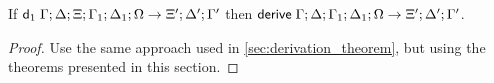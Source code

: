 \begin{theorem}
   If $\mathsf{d}_1 \; \Gamma; \Delta; \Xi; \Gamma_1; \Delta_1; \Omega \rightarrow \Xi'; \Delta'; \Gamma'$ then $\mathsf{derive} \; \Gamma; \Delta; \Gamma_1; \Delta_1; \Omega \rightarrow \Xi'; \Delta'; \Gamma'$.
\end{theorem}

\begin{proof}
   Use the same approach used in \ref{sec:derivation_theorem}, but using the theorems presented in this section.
\end{proof}

